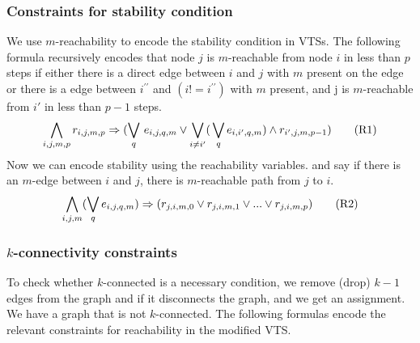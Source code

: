 
\subsubsection{Constraints for stability condition}
%
We use $m$-reachability to encode the stability condition in VTSs.
%
The following formula recursively encodes that node $j$ is $m$-reachable from node $i$ in less than $p$ steps
if either there is a direct edge between $i$ and $j$ with $m$ present on the edge or there is a edge between $i^{\prime \prime}$ and
$(i != i^{\prime \prime})$ with $m$ present, and j is $m$-reachable from $i'$ in less than $p-1$ steps.
%
\begin{align}
  \bigwedge\limits_{i,j,m,p} r_{i,j,m,p} \Rightarrow (\bigvee_{q} \, e_{i,j,q,m} \lor \bigvee_{i\neq i^{\prime}} ( \, \bigvee_{q} e_{i,i^{\prime},q,m}) \land r_{i^{\prime},j,m,p-1} )
  \tag{R1}\label{eq:reach1}
\end{align}
Now we can encode stability using the reachability variables.
and say if there is an $m$-edge between $i$ and $j$, there is
$m$-reachable path from $j$ to $i$.
\begin{align}
 \bigwedge\limits_{i,j,m} (\bigvee_{q} e_{i,j,q,m}) \Rightarrow (r_{j,i,m,0}  \lor r_{j,i,m,1} \lor ... \lor r_{j,i,m,p})  
  \tag{R2}\label{eq:reach2}
\end{align}







\subsubsection{$k$-connectivity constraints}
To check whether $k$-connected is a necessary condition, we remove (drop) $k-1$ edges from the graph and if it
disconnects the graph, and we get an assignment. We have a graph that is not  $k$-connected.
The following formulas encode the relevant constraints for reachability in the modified VTS. 

